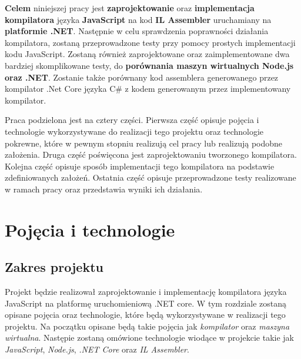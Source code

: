 \documentclass[a4paper]{article}
\begin{document}
\par \textbf{Celem} niniejszej pracy jest \textbf{zaprojektowanie} oraz \textbf{implementacja kompilatora} języka \textbf{JavaScript} na kod \textbf{IL Assembler} uruchamiany na \textbf{platformie .NET}. Następnie w celu sprawdzenia poprawności działania kompilatora, zostaną przeprowadzone testy przy pomocy prostych implementacji kodu JavaScript. Zostaną również zaprojektowane oraz zaimplementowane dwa bardziej skomplikowane testy, do \textbf{porównania maszyn wirtualnych Node.js oraz .NET}. Zostanie także porównany kod assemblera generowanego przez kompilator .Net Core języka C\# z kodem generowanym przez implementowany kompilator.

\par Praca podzielona jest na cztery części. Pierwsza część opisuje pojęcia i technologie wykorzystywane do realizacji tego projektu oraz technologie pokrewne, które w pewnym stopniu realizują cel pracy lub realizują podobne założenia. Druga część poświęcona jest zaprojektowaniu tworzonego kompilatora. Kolejna część opisuje sposób implementacji tego kompilatora na podstawie zdefiniowanych założeń. Ostatnia część opisuje przeprowadzone testy realizowane w ramach pracy oraz przedstawia wyniki ich działania.

\newpage

\section{Pojęcia i technologie}

\subsection{Zakres projektu}

Projekt będzie realizował zaprojektowanie i implementację kompilatora języka JavaScript na platformę uruchomieniową .NET core. W tym rozdziale zostaną opisane pojęcia oraz technologie, które będą wykorzystywane w realizacji tego projektu. Na początku opisane będą takie pojęcia jak \textit{kompilator} oraz \textit{maszyna wirtualna}. Następie zostaną omówione technologie wiodące w projekcie takie jak \textit{JavaScript}, \textit{Node.js}, \textit{.NET Core} oraz \textit{IL Assembler}.
\end{document}
